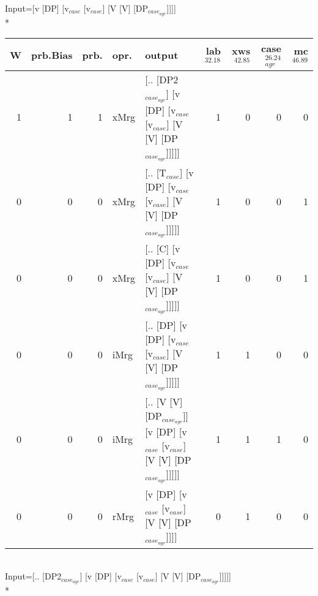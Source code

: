 \begingroup\scriptsize Input=[v [DP] [v$_{case}$ [v$_{case}$] [V [V] [DP$_{case_{agr}}$]]]]\\*
\begin{tabularx}{\linewidth}{rrrlXrrrr}
\hline
   W &   prb.Bias &   prb. & opr.   & output                                                                      &   lab$^{32.18}$ &   xws$^{42.85}$ &   case$_{agr}^{26.24}$ &   mc$^{46.89}$ \\
\hline
   1 &       1 &   1 & xMrg & [.. [DP2$_{case_{agr}}$] [v [DP] [v$_{case}$ [v$_{case}$] [V [V] [DP$_{case_{agr}}$]]]]]        &             1 &             0 &                  0 &            0 \\
   0 &       0 &   0 & xMrg & [.. [T$_{case}$] [v [DP] [v$_{case}$ [v$_{case}$] [V [V] [DP$_{case_{agr}}$]]]]]              &             1 &             0 &                  0 &            1 \\
   0 &       0 &   0 & xMrg & [.. [C] [v [DP] [v$_{case}$ [v$_{case}$] [V [V] [DP$_{case_{agr}}$]]]]]                   &             1 &             0 &                  0 &            1 \\
   0 &       0 &   0 & iMrg & [.. [DP] [v [DP] [v$_{case}$ [v$_{case}$] [V [V] [DP$_{case_{agr}}$]]]]]                  &             1 &             1 &                  0 &            0 \\
   0 &       0 &   0 & iMrg & [.. [V [V] [DP$_{case_{agr}}$]] [v [DP] [v$_{case}$ [v$_{case}$] [V [V] [DP$_{case_{agr}}$]]]]] &             1 &             1 &                  1 &            0 \\
   0 &       0 &   0 & rMrg & [v [DP] [v$_{case}$ [v$_{case}$] [V [V] [DP$_{case_{agr}}$]]]]                            &             0 &             1 &                  0 &            0 \\
\hline
\end{tabularx}\endgroup\\
\begingroup\scriptsize Input=[.. [DP2$_{case_{agr}}$] [v [DP] [v$_{case}$ [v$_{case}$] [V [V] [DP$_{case_{agr}}$]]]]]\\*
